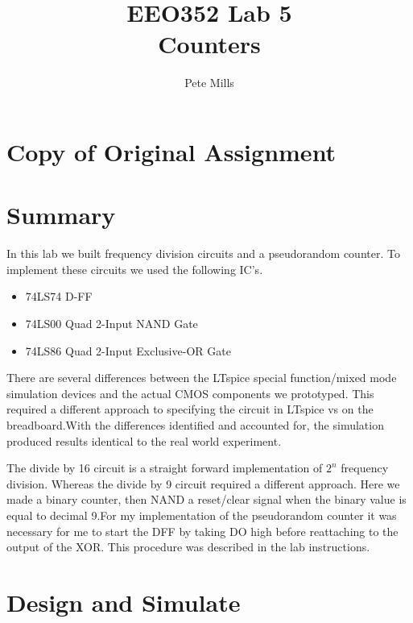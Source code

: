 \documentclass{article}
\begin{document}
	
	
	\title{EEO352 Lab 5\\Counters}
	\author{Pete Mills}
	
	\maketitle
	
	\section*{Copy of Original Assignment}
	
	
	
	
	\section*{Summary}
	
	In this lab we built frequency division circuits and a pseudorandom counter. To implement these circuits we used the following IC's.
	
	\begin{itemize}
	  \item 74LS74 D-FF
	  \item 74LS00 Quad 2-Input NAND Gate
	  \item 74LS86 Quad 2-Input Exclusive-OR Gate
	\end{itemize}
	
	There are several differences between the LTspice special function/mixed mode simulation devices and the actual CMOS components we prototyped. This required a different approach to specifying the circuit in LTspice vs on the breadboard.With the differences identified and accounted for, the simulation produced results identical to the real world experiment. 
	
	The divide by 16 circuit is a straight forward implementation of $2^n$ frequency division. Whereas the divide by 9 circuit required a different approach. Here we made a binary counter, then NAND a reset/clear signal when the binary value is equal to decimal 9.For my implementation of the pseudorandom counter it was necessary for me to start the DFF by taking DO high before reattaching to the output of the XOR. This procedure was described in the lab instructions.
	
	

	\section{Design and Simulate}
	
\end{document}
